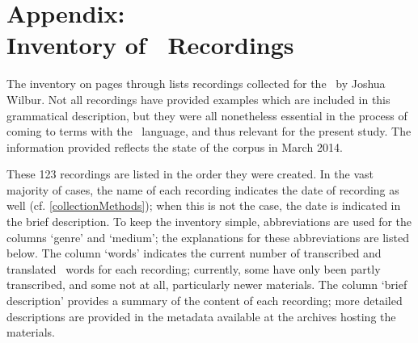 %



\appendix%
\chapter*{Appendix: \\Inventory of \PS\ Recordings}
\label{inventory}\hypertarget{inventoryRef}{}
The inventory on pages \pageref{inventoryBegin} through \pageref{inventoryEnd} 
lists recordings collected for the \PSDP\ by Joshua Wilbur. Not all recordings have provided examples which are included in this grammatical description, but they were all nonetheless essential in the process of coming to terms with the \PS\ language, and thus relevant for the present study. 
The information provided reflects the state of the corpus in March 2014. 

These 123 recordings are listed in the order they were created. In the vast majority of cases, the name of each recording indicates the date of recording as well (cf. \SEC\ref{collectionMethods}); when this is not the case, the date is indicated in the brief description. To keep the inventory simple, %
abbreviations are used for the columns ‘genre’ and ‘medium’; %
the explanations for these abbreviations are listed below. %
The column ‘words’ indicates the current number of transcribed and translated \PS\ words for each recording; currently, some have only been partly transcribed, and some not at all, particularly newer materials. 
The column ‘brief description’ provides a summary of the content of each recording; more detailed descriptions are provided in the metadata available at the archives hosting the materials. 

